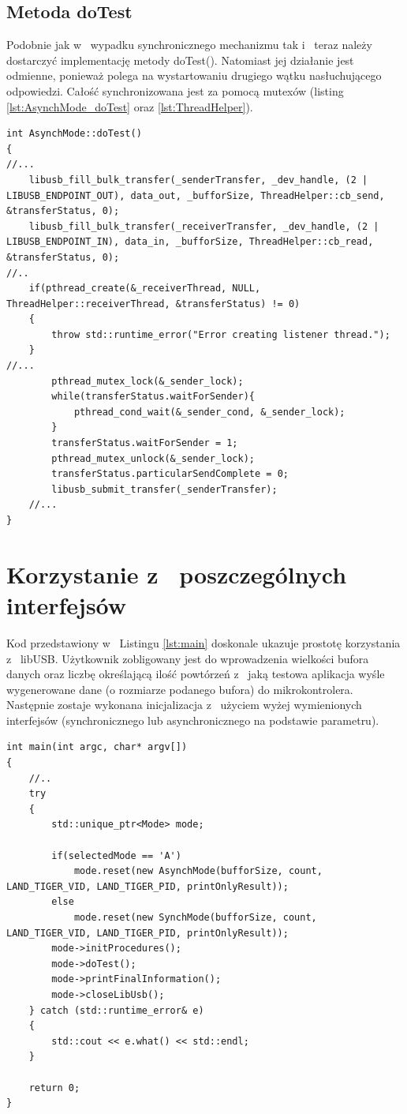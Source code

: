 \documentclass{BscUS}
\begin{document}
\subsection{Metoda doTest}
Podobnie jak w~ wypadku synchronicznego mechanizmu tak i~ teraz należy dostarczyć implementację metody doTest(). Natomiast jej działanie jest odmienne, ponieważ polega na wystartowaniu drugiego wątku nasłuchującego odpowiedzi. Całość synchronizowana jest za pomocą mutexów (listing \ref{lst:AsynchMode_doTest} oraz \ref{lst:ThreadHelper}).
\begin{lstlisting}[caption={Metoda AsynchMode::doTest().},label={lst:AsynchMode_doTest}]
int AsynchMode::doTest()
{
//...
	libusb_fill_bulk_transfer(_senderTransfer, _dev_handle, (2 | LIBUSB_ENDPOINT_OUT), data_out, _bufforSize, ThreadHelper::cb_send, &transferStatus, 0);
	libusb_fill_bulk_transfer(_receiverTransfer, _dev_handle, (2 | LIBUSB_ENDPOINT_IN), data_in, _bufforSize, ThreadHelper::cb_read, &transferStatus, 0);
//..
	if(pthread_create(&_receiverThread, NULL, ThreadHelper::receiverThread, &transferStatus) != 0)
	{
		throw std::runtime_error("Error creating listener thread.");
	}
//... 
		pthread_mutex_lock(&_sender_lock);
		while(transferStatus.waitForSender){
			pthread_cond_wait(&_sender_cond, &_sender_lock);
		}
		transferStatus.waitForSender = 1;
		pthread_mutex_unlock(&_sender_lock);
		transferStatus.particularSendComplete = 0;
		libusb_submit_transfer(_senderTransfer);
	//...
}

\end{lstlisting}

\section{Korzystanie z~ poszczególnych interfejsów}
Kod przedstawiony w~ Listingu \ref{lst:main} doskonale ukazuje prostotę korzystania z~ libUSB. Użytkownik zobligowany jest do wprowadzenia wielkości bufora danych oraz liczbę określającą ilość powtórzeń z~ jaką testowa aplikacja wyśle wygenerowane dane (o rozmiarze podanego bufora) do mikrokontrolera. Następnie zostaje wykonana inicjalizacja z~ użyciem wyżej wymienionych interfejsów (synchronicznego lub asynchronicznego na podstawie parametru).
\begin{lstlisting}[caption={Przykład użycia interfejsu synchronicznego lub asynchronicznego w~ zależności od parametryzacji.},label={lst:main}]
int main(int argc, char* argv[])
{
	//..
	try 
	{
		std::unique_ptr<Mode> mode;

		if(selectedMode == 'A')
			mode.reset(new AsynchMode(bufforSize, count, LAND_TIGER_VID, LAND_TIGER_PID, printOnlyResult));
		else 
			mode.reset(new SynchMode(bufforSize, count, LAND_TIGER_VID, LAND_TIGER_PID, printOnlyResult));
		mode->initProcedures();
		mode->doTest();
		mode->printFinalInformation();
		mode->closeLibUsb();
	} catch (std::runtime_error& e)
	{
		std::cout << e.what() << std::endl;
	}

	return 0;
}

\end{lstlisting}
\end{document}

